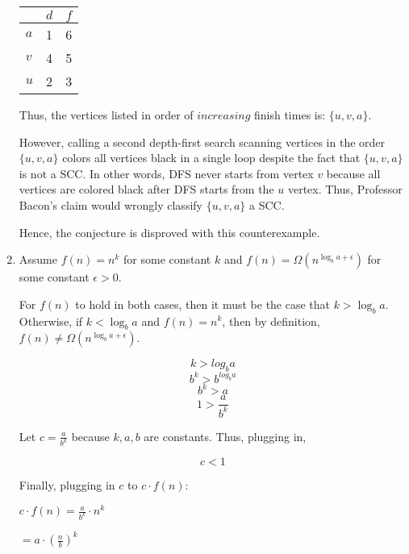 \documentclass[a4paper]{report}
\begin{document}
\begin{enumerate}
      \begin{center}
        \begin{tabular}{ l | c | r }
          \hline
            & $d$ & $f$ \\ \hline
          $a$ & 1 & 6 \\
          $v$ & 4 & 5 \\
          $u$ & 2 & 3 \\
          \hline  
        \end{tabular}
      \end{center}

      Thus, the vertices listed in order of $increasing$ finish times is: $\{u, v, a\}$.

      However, calling a second depth-first search scanning vertices in the order $\{u, v, a\}$ colors
      all vertices black in a single loop despite the fact that $\{u, v, a\}$ is not a SCC. 
      In other words, DFS never starts from vertex $v$ because all vertices are colored black after DFS starts from the $u$ vertex. 
      Thus, Professor Bacon's claim would wrongly classify $\{u, v, a\}$ a SCC.

      Hence, the conjecture is disproved with this counterexample.

    \par
    \bigskip

    \item
        Assume $f(n) = n^k$ for some constant $k$ and $f(n) = \Omega(n^{\log_b a + \epsilon})$ for some constant $\epsilon > 0$.

        For $f(n)$ to hold in both cases, then it must be the case that $k > \log _{b} a$. Otherwise, if $k < \log _{b} a$ and
        $f(n) = n^k$, then by definition, $f(n) \neq \Omega(n^{\log_b a + \epsilon})$.

        $$ k > log_b a$$
        $$ b^k > b^{log_b a} $$
        $$ b^k > a $$
        $$ 1 > \frac{a}{b^k} $$

        Let $c = \frac{a}{b^k}$ because $k, a, b$ are constants.  Thus, plugging in,

        $$ c < 1 $$

        Finally, plugging in $c$ to $c \cdot f(n)$:

        $c \cdot f(n) = \frac{a}{b^k} \cdot n^k$

        $             = a \cdot (\frac{n}{b})^k$


\end{enumerate}
\end{document}

